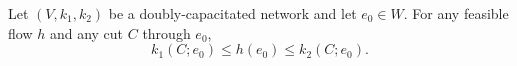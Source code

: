 Let $(V, k_1, k_2)$ be a doubly-capacitated network and let $e_0 \in W$. For any feasible flow $h$ and any cut $C$ through $e_0$,
$$k_1(C; e_0) \leq h(e_0) \leq k_2(C; e_0).$$
